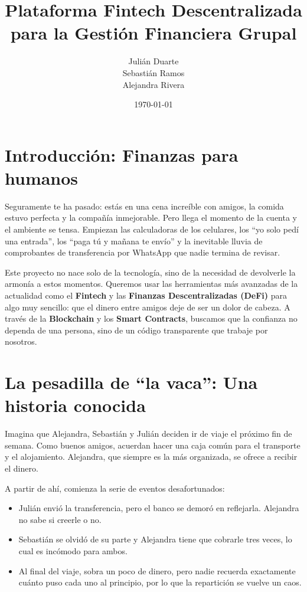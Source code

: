 \documentclass[12pt,a4paper]{article}
\title{Plataforma Fintech Descentralizada para la Gestión Financiera Grupal}
\author{Julián Duarte \\ Sebastián Ramos \\ Alejandra Rivera}
\date{\today}
\begin{document}
\maketitle

\section*{Introducción: Finanzas para humanos}

Seguramente te ha pasado: estás en una cena increíble con amigos, la comida estuvo perfecta y la compañía inmejorable. Pero llega el momento de la cuenta y el ambiente se tensa. Empiezan las calculadoras de los celulares, los ``yo solo pedí una entrada'', los ``paga tú y mañana te envío'' y la inevitable lluvia de comprobantes de transferencia por WhatsApp que nadie termina de revisar. 

Este proyecto no nace solo de la tecnología, sino de la necesidad de devolverle la armonía a estos momentos. Queremos usar las herramientas más avanzadas de la actualidad como el \textbf{Fintech} y las \textbf{Finanzas Descentralizadas (DeFi)} para algo muy sencillo: que el dinero entre amigos deje de ser un dolor de cabeza. A través de la \textbf{Blockchain} y los \textbf{Smart Contracts}, buscamos que la confianza no dependa de una persona, sino de un código transparente que trabaje por nosotros.

\section*{La pesadilla de ``la vaca'': Una historia conocida}

Imagina que Alejandra, Sebastián y Julián deciden ir de viaje el próximo fin de semana. Como buenos amigos, acuerdan hacer una caja común para el transporte y el alojamiento. Alejandra, que siempre es la más organizada, se ofrece a recibir el dinero. 

A partir de ahí, comienza la serie de eventos desafortunados:
\begin{itemize}
    \item Julián envió la transferencia, pero el banco se demoró en reflejarla. Alejandra no sabe si creerle o no.
    \item Sebastián se olvidó de su parte y Alejandra tiene que cobrarle tres veces, lo cual es incómodo para ambos.
    \item Al final del viaje, sobra un poco de dinero, pero nadie recuerda exactamente cuánto puso cada uno al principio, por lo que la repartición se vuelve un caos.
\end{itemize}
\end{document}

